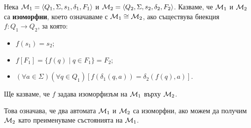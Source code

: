 \begin{dfn}
  Нека $\mathcal{M}_1 = \langle{Q_1,\Sigma,s_1,\delta_1,F_1}\rangle$ и $\mathcal{M}_2 = \langle{Q_2,\Sigma,s_2,\delta_2,F_2}\rangle$.
  Казваме, че $\mathcal{M}_1$ и $\mathcal{M}_2$ са {\bf изоморфни}, което означаваме с $\mathcal{M}_1 \cong \mathcal{M}_2$, ако
  съществува биекция $f: Q_1\to Q_2$, за която:
  \begin{itemize}
  \item
    $f(s_1) = s_2$;
  \item
    $f[F_1] = \{f(q)\mid q\in F_1\} = F_2$;
  \item
    $(\forall a\in\Sigma)(\forall q\in Q_1)[f(\delta_1(q,a)) = \delta_2(f(q),a)]$.
  \end{itemize}
  Ще казваме, че $f$ задава изоморфизъм на $\mathcal{M}_1$ върху $\mathcal{M}_2$.
\end{dfn}

Това означава, че два автомата $\mathcal{M}_1$ и $\mathcal{M}_2$ са изоморфни, ако можем да получим $\mathcal{M}_2$
като преименуваме състоянията на $\mathcal{M}_1$.

